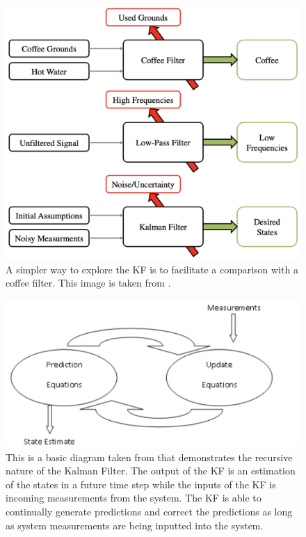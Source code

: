\begin{figure}[ht]
    \centering
    \includegraphics[scale = 0.4]{coffee.png}
    \caption{A simpler way to explore the KF is to facilitate a comparison with a coffee filter. This image is taken from \cite{article7}.}
      \label{fig:coffee}
    \end{figure}

\begin{figure}[ht]
    \centering
    \includegraphics[scale = 0.3]{diagram.png}
    \caption{This is a basic diagram taken from \cite{kohanbash_2014} that demonstrates the recursive nature of the Kalman Filter. The output of the KF is an estimation of the states in a future time step while the inputs of the KF is incoming measurements from the system. The KF is able to continually generate predictions and correct the predictions as long as system measurements are being inputted into the system.}
    \label{fig:recursive}
\end{figure}
\clearpage




